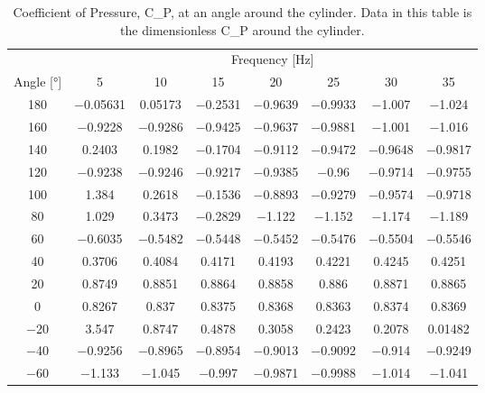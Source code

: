 \begin{table}[htpb]
    \caption{Coefficient of Pressure, \gls{C_P}, at an angle around the cylinder. Data in this table is the dimensionless \gls{C_P} around the cylinder.}
    \label{tab:C_P_data}
    \centering
    \begin{tabular}{cccccccc}
        \toprule
        & \multicolumn{7}{c}{Frequency [\unit{\hertz}]} \\
        \cmidrule(lr){2-8}
        Angle [\unit{\degree}] & 5 & 10 & 15 & 20 & 25 & 30 & 35 \\
        \midrule
        \num{180} & \num{-0.05631} & \num{0.05173} & \num{-0.2531} & \num{-0.9639} & \num{-0.9933} & \num{-1.007} & \num{-1.024} \\
		\num{160} & \num{-0.9228} & \num{-0.9286} & \num{-0.9425} & \num{-0.9637} & \num{-0.9881} & \num{-1.001} & \num{-1.016} \\
		\num{140} & \num{0.2403} & \num{0.1982} & \num{-0.1704} & \num{-0.9112} & \num{-0.9472} & \num{-0.9648} & \num{-0.9817} \\
		\num{120} & \num{-0.9238} & \num{-0.9246} & \num{-0.9217} & \num{-0.9385} & \num{-0.96} & \num{-0.9714} & \num{-0.9755} \\
		\num{100} & \num{1.384} & \num{0.2618} & \num{-0.1536} & \num{-0.8893} & \num{-0.9279} & \num{-0.9574} & \num{-0.9718} \\
		\num{80} & \num{1.029} & \num{0.3473} & \num{-0.2829} & \num{-1.122} & \num{-1.152} & \num{-1.174} & \num{-1.189} \\
		\num{60} & \num{-0.6035} & \num{-0.5482} & \num{-0.5448} & \num{-0.5452} & \num{-0.5476} & \num{-0.5504} & \num{-0.5546} \\
		\num{40} & \num{0.3706} & \num{0.4084} & \num{0.4171} & \num{0.4193} & \num{0.4221} & \num{0.4245} & \num{0.4251} \\
		\num{20} & \num{0.8749} & \num{0.8851} & \num{0.8864} & \num{0.8858} & \num{0.886} & \num{0.8871} & \num{0.8865} \\
		\num{0} & \num{0.8267} & \num{0.837} & \num{0.8375} & \num{0.8368} & \num{0.8363} & \num{0.8374} & \num{0.8369} \\
		\num{-20} & \num{3.547} & \num{0.8747} & \num{0.4878} & \num{0.3058} & \num{0.2423} & \num{0.2078} & \num{0.01482} \\
		\num{-40} & \num{-0.9256} & \num{-0.8965} & \num{-0.8954} & \num{-0.9013} & \num{-0.9092} & \num{-0.914} & \num{-0.9249} \\
		\num{-60} & \num{-1.133} & \num{-1.045} & \num{-0.997} & \num{-0.9871} & \num{-0.9988} & \num{-1.014} & \num{-1.041} \\

\end{tabular}
\end{table}
